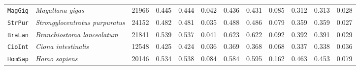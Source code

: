 \begin{table}
\begin{tabular}{llrrrrrrrrrr}
    \texttt{MagGig} & \textit{Magallana gigas}               & \num{21966} & 0.445 & 0.444 & 0.042 & 0.436 & 0.431 & 0.085 & 0.312 & 0.313 & 0.028 \\
    \texttt{StrPur} & \textit{Strongylocentrotus purpuratus} & \num{24152} & 0.482 & 0.481 & 0.035 & 0.488 & 0.486 & 0.079 & 0.359 & 0.359 & 0.027 \\
    \texttt{BraLan} & \textit{Branchiostoma lanceolatum}     & \num{21841} & 0.539 & 0.537 & 0.041 & 0.623 & 0.622 & 0.092 & 0.392 & 0.391 & 0.029 \\
    \texttt{CioInt} & \textit{Ciona intestinalis}            & \num{12548} & 0.425 & 0.424 & 0.036 & 0.369 & 0.368 & 0.068 & 0.337 & 0.338 & 0.036 \\
    \texttt{HomSap} & \textit{Homo sapiens}                  & \num{20146} & 0.534 & 0.538 & 0.084 & 0.584 & 0.595 & 0.162 & 0.463 & 0.453 & 0.079 \\
    \bottomrule
    \end{tabular}
\end{table}


